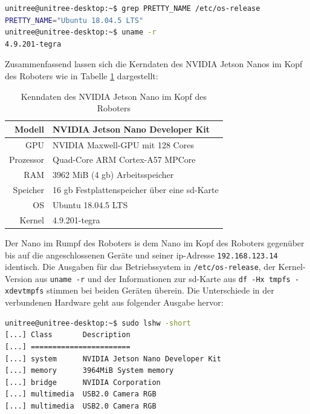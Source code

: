 \begin{lstlisting}[language=sh, label=lst:nanos-kopf-os]
unitree@unitree-desktop:~$ grep PRETTY_NAME /etc/os-release
PRETTY_NAME="Ubuntu 18.04.5 LTS"
unitree@unitree-desktop:~$ uname -r
4.9.201-tegra
\end{lstlisting}

Zusammenfassend lassen sich die Kerndaten des NVIDIA Jetson Nanos im Kopf des Roboters wie in Tabelle \ref{tab:data-head-nano} dargestellt:

\begin{table}[h]
    \centering
    \begin{tabular}{|r|l|}
        \hline
        Modell    & NVIDIA Jetson Nano Developer Kit\\ \hline
        GPU       & NVIDIA Maxwell-GPU mit 128 Cores\\ \hline
        Prozessor & Quad-Core ARM Cortex-A57 MPCore\\ \hline
        RAM       & \num{3962} MiB (\num{4} \gls{gb}) Arbeitsspeicher\\ \hline
        Speicher  & \num{16} \gls{gb} Festplattenspeicher über eine \gls{sd}-Karte\\ \hline
        OS        & Ubuntu 18.04.5 LTS\\ \hline
        Kernel    & 4.9.201-tegra \\ \hline
    \end{tabular}\caption{Kenndaten des NVIDIA Jetson Nano im Kopf des Roboters}\label{tab:data-head-nano}
\end{table}


\label{par:nano-rumpf}

Der Nano im Rumpf des Roboters is dem Nano im Kopf des Roboters gegenüber bis auf die angeschlossenen Geräte und seiner
\gls{ip}-Adresse \texttt{192.168.123.14} identisch.
Die Ausgaben für das Betriebssystem in \texttt{/etc/os-release}, der Kernel-Version aus \texttt{uname -r} und der Informationen
zur \gls{sd}-Karte aus \texttt{df -Hx tmpfs -xdevtmpfs} stimmen bei beiden Geräten überein.
Die Unterschiede in der verbundenen Hardware geht aus folgender Ausgabe hervor:

\begin{lstlisting}[language=sh, label=lst:nanos-hardware-rumpf, columns=fixed]
unitree@unitree-desktop:~$ sudo lshw -short
[...] Class       Description
[...] =======================
[...] system      NVIDIA Jetson Nano Developer Kit
[...] memory      3964MiB System memory
[...] bridge      NVIDIA Corporation
[...] multimedia  USB2.0 Camera RGB
[...] multimedia  USB2.0 Camera RGB
\end{lstlisting}

